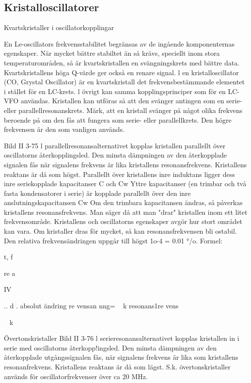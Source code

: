 \subsection{Kristalloscillatorer}
Kvartskristaller i oscillatorkopplingar

En Le-oscillators frekvensstabilitet begränsas av de ingående komponenternas egenskaper. När mycket bättre stabiltet än så
krävs, speciellt inom stora temperaturområden, så är kvartskristallen en svängningskrets med bättre data. Kvartskristallens höga
Q-värde ger också en renare signal.
l en kristalloscillator (CO, Grystal Oscillator) är en kvartskristall det frekvensbestämmande elementet i stället för en LC-krets. l
övrigt kan samma kopplingsprinciper som
för en LC-VFO användas.
Kristallen kan utföras så att den svänger
antingen som en serie- eller parallellresonanskrets. Märk, att en kristall svänger på
något olika frekvens beroende på om den fås
att fungera som serie- eller parallellkrets.
Den högre frekvensen är den som vanligen
används.

Bild II 3-75
l parallellresonansalternativet kopplas
kristallen parallellt över oscillatorns återkopplingsled. Den minsta dämpningen av
den återkopplade signalen fås när signalens
frekvens är lika kristallens resonansfrekvens.
Kristallens reaktans är då som högst.
Parallellt över kristallens inre induktans
ligger dess inre seriekopplade kapacitanser
C och Cw Yttre kapacitanser (en trimbar och
två fasta kondensatorer i serie) är kopplade
parallellt över den inre anslutningskapacitansen Cw
Om den trimbara kapacitansen ändras,
så påverkas kristallens resonansfrekvens.
Man säger då att man "drar" kristallen inom
ett litet frekvensområde. Kristallens och oscillatorns egenskaper avgör hur stort området kan vara. Om kristaller dras för mycket,
så kan resonansfrekvensen bli ostabil.
Den relativa frekvensändringen uppgår
till högst 1o-4 = 0.01 °/o. Formel:

t, f

re a

IV

.. d .
absolut ändring
re vensan nng=
~ k
resonans1re vens

~ k

Övertonskristaller
Bild II 3-76
l serieresonansalternativet kopplas kristallen in i serie med oscillatorns återkopp!ingsled. Den minsta dämpningen av den
återkopplade utgångssignalen fås, när signalens frekvens är lika som kristallens resonanfrekvens. Kristallens reaktans är då som
lägst. S.k. övertonskristaller används för oscillatorfrekvenser över ca 20 MHz.

